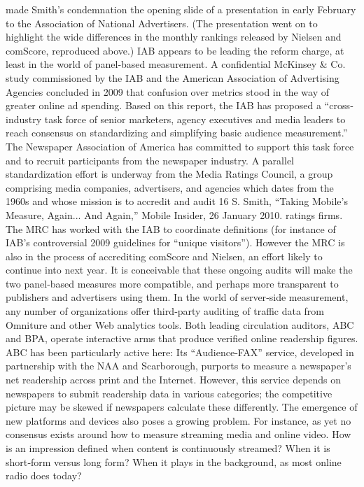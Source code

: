 made Smith’s condemnation the opening slide of a presentation in early
February to the Association of National Advertisers. (The presentation
went on to highlight the wide differences in the monthly rankings
released by Nielsen and comScore, reproduced above.)
IAB appears to be leading the reform charge, at least in the world of
panel‐based measurement. A confidential McKinsey & Co. study
commissioned by the IAB and the American Association of Advertising
Agencies concluded in 2009 that confusion over metrics stood in the way
of greater online ad spending. Based on this report, the IAB has proposed
a ``cross‐industry task force of senior marketers, agency executives and
media leaders to reach consensus on standardizing and simplifying basic
audience measurement.'' The Newspaper Association of America has
committed to support this task force and to recruit participants from the
newspaper industry.
A parallel standardization effort is underway from the Media Ratings
Council, a group comprising media companies, advertisers, and agencies
which dates from the 1960s and whose mission is to accredit and audit
16 S. Smith, ``Taking Mobile's Measure, Again... And Again,'' Mobile Insider, 26
January 2010.
ratings firms. The MRC has worked with the IAB to coordinate definitions
(for instance of IAB’s controversial 2009 guidelines for ``unique visitors'').
However the MRC is also in the process of accrediting comScore and
Nielsen, an effort likely to continue into next year. It is conceivable that
these ongoing audits will make the two panel‐based measures more
compatible, and perhaps more transparent to publishers and advertisers
using them.
In the world of server‐side measurement, any number of organizations
offer third‐party auditing of traffic data from Omniture and other Web
analytics tools. Both leading circulation auditors, ABC and BPA, operate
interactive arms that produce verified online readership figures. ABC has
been particularly active here: Its ``Audience‐FAX'' service, developed in
partnership with the NAA and Scarborough, purports to measure a
newspaper’s net readership across print and the Internet. However, this
service depends on newspapers to submit readership data in various
categories; the competitive picture may be skewed if newspapers calculate
these differently.
The emergence of new platforms and devices also poses a growing
problem. For instance, as yet no consensus exists around how to measure
streaming media and online video. How is an impression defined when
content is continuously streamed? When it is short‐form versus long
form? When it plays in the background, as most online radio does today?
